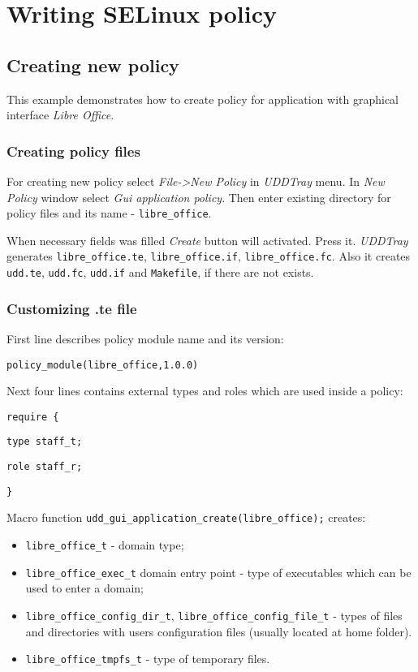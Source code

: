 \chapter{Writing SELinux policy}
\section{Creating new policy}\label{creating_new_policy}

This example demonstrates how to create policy for application with
graphical interface \emph{Libre Office}.

\subsection{Creating policy files}

For creating new policy select \emph{File-\textgreater{}New Policy} in
\emph{UDDTray} menu. In \emph{New Policy} window select \emph{Gui
application policy}. Then enter existing directory for policy files and
its name - \texttt{libre\_office}.


When necessary fields was filled \emph{Create} button will activated.
Press it. \emph{UDDTray} generates \texttt{libre\_office.te},
\texttt{libre\_office.if}, \texttt{libre\_office.fc}. Also it creates
\texttt{udd.te}, \texttt{udd.fc}, \texttt{udd.if} and \texttt{Makefile},
if there are not exists.

\subsection{Customizing .te file}

First line describes policy module name and its version:

\texttt{policy\_module(libre\_office,1.0.0)}

Next four lines contains external types and roles which are used inside
a policy:

\texttt{require \{}

\texttt{type staff\_t;}

\texttt{role staff\_r;}

\texttt{\}}

Macro function \texttt{udd\_gui\_application\_create(libre\_office);}
creates:

\begin{itemize}
\item
  \texttt{libre\_office\_t} - domain type;
\item
  \texttt{libre\_office\_exec\_t} domain entry point - type of
  executables which can be used to enter a domain;
\item
  \texttt{libre\_office\_config\_dir\_t},
  \texttt{libre\_office\_config\_file\_t} - types of files and
  directories with users configuration files (usually located at home
  folder).\\
\item
  \texttt{libre\_office\_tmpfs\_t} - type of temporary files.
\end{itemize}

